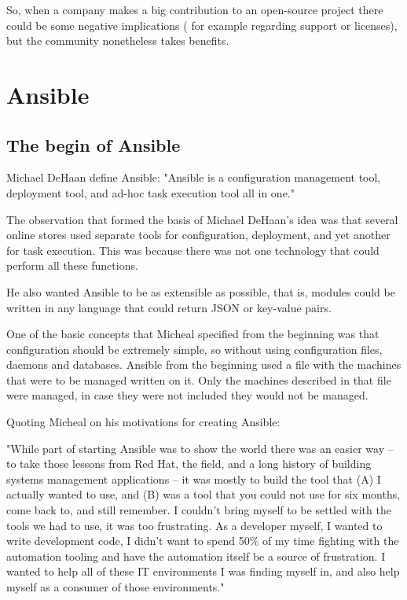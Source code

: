 \documentclass[12pt,a4paper,openright,twoside]{book}
\begin{document}
So, when a company makes a big contribution to an open-source project there could be some negative implications ( for example regarding support or licenses), but the community nonetheless takes benefits.

\chapter{Ansible}

\section{The begin of Ansible}

Michael DeHaan define Ansible:
"Ansible is a configuration management tool, deployment tool, and ad-hoc task execution tool all in one."


The observation that formed the basis of Michael DeHaan's idea was that several online stores used separate tools for configuration, deployment, and yet another for task execution. This was because there was not one technology that could perform all these functions.


He also wanted Ansible to be as extensible as possible, that is, modules could be written in any language that could return JSON or key-value pairs.

One of the basic concepts that Micheal specified from the beginning was that configuration should be extremely simple, so without using configuration files, daemons and databases. Ansible from the beginning used a file with the machines that were to be managed written on it. Only the machines described in that file were managed, in case they were not included they would not be managed.

Quoting Micheal on his motivations for creating Ansible:


"While part of starting Ansible was to show the world there was an easier way -- to take those lessons from Red Hat, the field, and a long history of building systems management applications -- it was mostly to build the tool that (A) I actually wanted to use, and (B) was a tool that you could not use for six months, come back to, and still remember. I couldn't bring myself to be settled with the tools we had to use, it was too frustrating. As a developer myself, I wanted to write development code, I didn't want to spend 50\% of my time fighting with the automation tooling and have the automation itself be a source of frustration. I wanted to help all of these IT environments I was finding myself in, and also help myself as a consumer of those environments."
\end{document}
